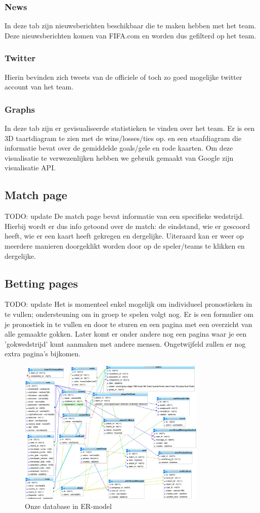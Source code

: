 \documentclass[11pt, a4paper]{article}
\begin{document}
\subsubsection{News}
In deze tab zijn nieuwsberichten beschikbaar die te maken hebben met het team. Deze nieuwsberichten komen van FIFA.com en worden dus gefilterd op het team.
\subsubsection{Twitter}
Hierin bevinden zich tweets van de officiele of toch zo goed mogelijke twitter account van het team.
\subsubsection{Graphs}
In deze tab zijn er gevisualiseerde statistieken te vinden over het team. Er is een 3D taartdiagram te zien met de wins/losses/ties op. en een staafdiagram die informatie bevat over de gemiddelde goals/gele en rode kaarten.
Om deze visualisatie te verwezenlijken hebben we gebruik gemaakt van Google zijn visualisatie API.

\subsection{Match page}
TODO: update
De match page bevat informatie van een specifieke wedstrijd. Hierbij wordt er dus info getoond over de match: de eindstand, wie er gescoord heeft, wie er een kaart heeft gekregen en dergelijke. Uiteraard kan er weer op meerdere manieren doorgeklikt worden door op de speler/teams te klikken en dergelijke.

\subsection{Betting pages}
TODO: update
Het is momenteel enkel mogelijk om individueel pronostieken in te vullen; ondersteuning om in groep te spelen volgt nog. Er is een formulier om je pronostiek in te vullen en door te sturen en een pagina met een overzicht van alle gemaakte gokken. Later komt er onder andere nog een pagina waar je een 'gokwedstrijd' kunt aanmaken met andere mensen. Ongetwijfeld zullen er nog extra pagina's bijkomen.

\begin{figure}[ht!]
\centering
\includegraphics[width=90mm]{ER.png}
\caption{Onze database in ER-model}
\label{overflow}
\end{figure}
\end{document}
